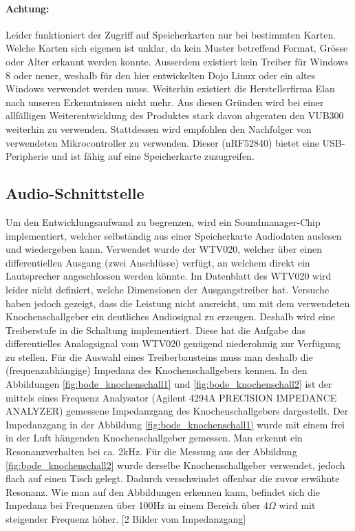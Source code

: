 \paragraph{Achtung:} Leider funktioniert der Zugriff auf Speicherkarten nur bei bestimmten Karten. 
Welche Karten sich eigenen ist unklar, da kein Muster betreffend Format, Grösse oder Alter erkannt werden konnte.
Ausserdem existiert kein Treiber für Windows 8 oder neuer, weshalb für den hier entwickelten Dojo Linux oder ein altes Windows verwendet werden muss.
Weiterhin existiert die Herstellerfirma Elan nach unseren Erkenntnissen nicht mehr. Aus diesen Gründen wird bei einer allfälligen Weiterentwicklung des Produktes stark davon abgeraten den VUB300 weiterhin zu verwenden.
Stattdessen wird empfohlen den Nachfolger von verwendeten Mikrocontroller zu verwenden. Dieser (nRF52840) bietet eine USB-Peripherie und ist fähig auf eine Speicherkarte zuzugreifen. 


\newpage

\subsection{Audio-Schnittstelle}

  Um den Entwicklungsaufwand zu begrenzen, wird ein Soundmanager-Chip implementiert, welcher selbständig aus einer Speicherkarte Audiodaten auslesen und wiedergeben kann. Verwendet wurde der WTV020, welcher über einen differentiellen Ausgang (zwei Anschlüsse) verfügt, an welchem direkt ein Lautsprecher angeschlossen werden könnte. 
  Im Datenblatt des WTV020 wird leider nicht definiert, welche Dimensionen der Ausgangstreiber hat. 
  Versuche haben jedoch gezeigt, dass die Leistung nicht ausreicht, um mit dem verwendeten Knochenschallgeber ein deutliches Audiosignal zu erzeugen. 
  Deshalb wird eine Treiberstufe in die Schaltung implementiert. 
  Diese hat die Aufgabe das differentielles Analogsignal vom WTV020 genügend niederohmig zur Verfügung zu stellen. 
  Für die Auswahl eines Treiberbausteins muss man deshalb die (frequenzabhängige) Impedanz des Knochenschallgebers kennen. 
  In den Abbildungen \ref{fig:bode_knochenschall1} und \ref{fig:bode_knochenschall2} ist der mittels eines Frequenz Analysator (Agilent 4294A PRECISION IMPEDANCE ANALYZER) gemessene Impedanzgang des Knochenschallgebers dargestellt. 
  Der Impedanzgang in der Abbildung \ref{fig:bode_knochenschall1} wurde mit einem frei in der Luft hängenden Knochenschallgeber gemessen. Man erkennt ein Resonanzverhalten bei ca. 2kHz. 
  Für die Messung aus der Abbildung \ref{fig:bode_knochenschall2} wurde derselbe Knochenschallgeber verwendet, jedoch flach auf einen Tisch gelegt. 
  Dadurch verschwindet offenbar die zuvor erwähnte Resonanz. 
  Wie man auf den Abbildungen erkennen kann, befindet sich die Impedanz bei Frequenzen über 100Hz in einem Bereich über 4\(\Omega\) wird mit steigender Frequenz höher. 
  [2 Bilder vom Impedanzgang]
  
